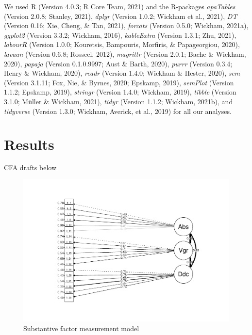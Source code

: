 \documentclass[
  english,
  man]{apa6}
\begin{document}
We used R (Version 4.0.3; R Core Team, 2021) and the R-packages \emph{apaTables} (Version 2.0.8; Stanley, 2021), \emph{dplyr} (Version 1.0.2; Wickham et al., 2021), \emph{DT} (Version 0.16; Xie, Cheng, \& Tan, 2021), \emph{forcats} (Version 0.5.0; Wickham, 2021a), \emph{ggplot2} (Version 3.3.2; Wickham, 2016), \emph{kableExtra} (Version 1.3.1; Zhu, 2021), \emph{labourR} (Version 1.0.0; Kouretsis, Bampouris, Morfiris, \& Papageorgiou, 2020), \emph{lavaan} (Version 0.6.8; Rosseel, 2012), \emph{magrittr} (Version 2.0.1; Bache \& Wickham, 2020), \emph{papaja} (Version 0.1.0.9997; Aust \& Barth, 2020), \emph{purrr} (Version 0.3.4; Henry \& Wickham, 2020), \emph{readr} (Version 1.4.0; Wickham \& Hester, 2020), \emph{sem} (Version 3.1.11; Fox, Nie, \& Byrnes, 2020; Epskamp, 2019), \emph{semPlot} (Version 1.1.2; Epskamp, 2019), \emph{stringr} (Version 1.4.0; Wickham, 2019), \emph{tibble} (Version 3.1.0; Müller \& Wickham, 2021), \emph{tidyr} (Version 1.1.2; Wickham, 2021b), and \emph{tidyverse} (Version 1.3.0; Wickham, Averick, et al., 2019) for all our analyses.

\hypertarget{results}{%
\section{Results}\label{results}}

CFA drafts below

\begin{figure}
\centering
\includegraphics{SIOPpapaja_files/figure-latex/CFAatt1-1.pdf}
\caption{\label{fig:CFAatt1}Substantive factor measurement model}
\end{figure}
\end{document}
